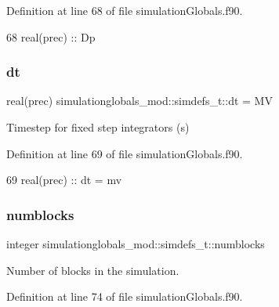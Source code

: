 Definition at line 68 of file simulation\+Globals.\+f90.


\begin{DoxyCode}
68         \textcolor{keywordtype}{real(prec)}      ::  Dp
\end{DoxyCode}
\mbox{\label{structsimulationglobals__mod_1_1simdefs__t_a3893522d33efbdcb47d81ed1963a228c}} 
\subsubsection{\texorpdfstring{dt}{dt}}
{\footnotesize\ttfamily real(prec) simulationglobals\+\_\+mod\+::simdefs\+\_\+t\+::dt = MV\hspace{0.3cm}{\ttfamily [private]}}



Timestep for fixed step integrators (s) 



Definition at line 69 of file simulation\+Globals.\+f90.


\begin{DoxyCode}
69         \textcolor{keywordtype}{real(prec)}      ::  dt = mv         
\end{DoxyCode}
\mbox{\label{structsimulationglobals__mod_1_1simdefs__t_adf59068d8301acd45881aea6cccd8644}} 
\subsubsection{\texorpdfstring{numblocks}{numblocks}}
{\footnotesize\ttfamily integer simulationglobals\+\_\+mod\+::simdefs\+\_\+t\+::numblocks\hspace{0.3cm}{\ttfamily [private]}}



Number of blocks in the simulation. 



Definition at line 74 of file simulation\+Globals.\+f90.


